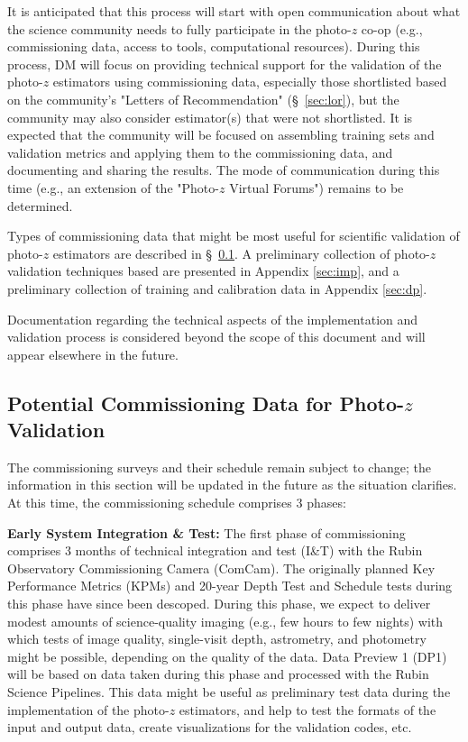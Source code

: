 \documentclass[DM,lsstdraft,toc]{lsstdoc}
\begin{document}
It is anticipated that this process will start with open communication about what the science community needs to fully participate in the photo-$z$ co-op (e.g., commissioning data, access to tools, computational resources).
During this process, DM will focus on providing technical support for the validation of the photo-$z$ estimators using commissioning data, especially those shortlisted based on the community's "Letters of Recommendation" (\S~\ref{sec:lor}), but the community may also consider estimator(s) that were not shortlisted.
It is expected that the community will be focused on assembling training sets and validation metrics and applying them to the commissioning data, and documenting and sharing the results.
The mode of communication during this time (e.g., an extension of the "Photo-$z$ Virtual Forums") remains to be determined.

Types of commissioning data that might be most useful for scientific validation of photo-$z$ estimators are described in \S~\ref{ssec:pzcoop_commissioning}.
A preliminary collection of photo-$z$ validation techniques based are presented in Appendix \ref{sec:imp}, and a preliminary collection of training and calibration data in Appendix \ref{sec:dp}.

Documentation regarding the technical aspects of the implementation and validation process is considered beyond the scope of this document and will appear elsewhere in the future.

\subsection{Potential Commissioning Data for Photo-$z$ Validation}\label{ssec:pzcoop_commissioning}

The commissioning surveys and their schedule remain subject to change; the information in this section will be updated in the future as the situation clarifies.
At this time, the commissioning schedule comprises 3 phases: 

{\bf Early System Integration \& Test:}
The first phase of commissioning comprises 3 months of technical integration and test (I\&T) with the Rubin Observatory Commissioning Camera (ComCam).
The originally planned Key Performance Metrics (KPMs) and 20-year Depth Test and Schedule tests during this phase have since been descoped. 
During this phase, we expect to deliver modest amounts of science-quality imaging (e.g., few hours to few nights) with which tests of image quality, single-visit depth, astrometry, and photometry might be possible, depending on the quality of the data.  
Data Preview 1 (DP1) will be based on data taken during this phase and processed with the Rubin Science Pipelines. 
This data might be useful as preliminary test data during the implementation of the photo-$z$ estimators, and help to test the formats of the input and output data, create visualizations for the validation codes, etc.
\end{document}
